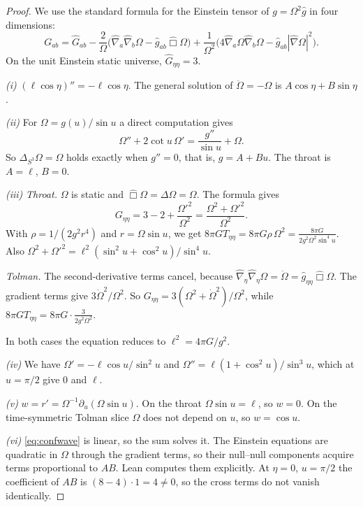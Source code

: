 \begin{proof}
We use the standard formula for the Einstein tensor of $g=\Omega^2\hat g$ in four dimensions:
\[
G_{ab}=\hat G_{ab}-\frac2\Omega\bigl(\hat\nabla_a\hat\nabla_b\Omega-\hat g_{ab}\hat\Box\Omega\bigr)+\frac1{\Omega^2}\bigl(4\hat\nabla_a\Omega\hat\nabla_b\Omega-\hat g_{ab}|\hat\nabla\Omega|^2\bigr).
\]
On the unit Einstein static universe, $\hat G_{\eta\eta}=3$.

\emph{(i)} $(\ell\cos\eta)''=-\ell\cos\eta$. The general solution of $\ddot\Omega=-\Omega$ is $A\cos\eta+B\sin\eta$.

\emph{(ii)} For $\Omega=g(u)/\sin u$ a direct computation gives
\[
\Omega''+2\cot u\,\Omega'=\frac{g''}{\sin u}+\Omega .
\]
So $\Delta_{S^3}\Omega=\Omega$ holds exactly when $g''=0$, that is, $g=A+Bu$. The throat is $A=\ell$, $B=0$.

\emph{(iii)} \emph{Throat.} $\Omega$ is static and $\hat\Box\Omega=\Delta\Omega=\Omega$. The formula gives
\[
G_{\eta\eta}=3-2+\frac{\Omega'^2}{\Omega^2}=\frac{\Omega^2+\Omega'^2}{\Omega^2}.
\]
With $\rho=1/(2g^2r^4)$ and $r=\Omega\sin u$, we get $8\pi GT_{\eta\eta}=8\pi G\rho\,\Omega^2=\frac{8\pi G}{2g^2\Omega^2\sin^4u}$. Also $\Omega^2+\Omega'^2=\ell^2(\sin^2u+\cos^2u)/\sin^4u$.

\emph{Tolman.} The second-derivative terms cancel, because $\hat\nabla_\eta\hat\nabla_\eta\Omega=\ddot\Omega=\hat g_{\eta\eta}\hat\Box\Omega$. The gradient terms give $3\dot\Omega^2/\Omega^2$. So $G_{\eta\eta}=3(\Omega^2+\dot\Omega^2)/\Omega^2$, while $8\pi GT_{\eta\eta}=8\pi G\cdot\frac3{2g^2\Omega^2}$.

In both cases the equation reduces to $\ell^2=4\pi G/g^2$.

\emph{(iv)} We have $\Omega'=-\ell\cos u/\sin^2u$ and $\Omega''=\ell(1+\cos^2u)/\sin^3u$, which at $u=\pi/2$ give $0$ and $\ell$.

\emph{(v)} $w=r'=\Omega^{-1}\partial_u(\Omega\sin u)$. On the throat $\Omega\sin u=\ell$, so $w=0$. On the time-symmetric Tolman slice $\Omega$ does not depend on $u$, so $w=\cos u$.

\emph{(vi)} \eqref{eq:confwave} is linear, so the sum solves it. The Einstein equations are quadratic in $\Omega$ through the gradient terms, so their null--null components acquire terms proportional to $AB$. Lean computes them explicitly. At $\eta=0$, $u=\pi/2$ the coefficient of $AB$ is $(8-4)\cdot1=4\ne0$, so the cross terms do not vanish identically.
\end{proof}


